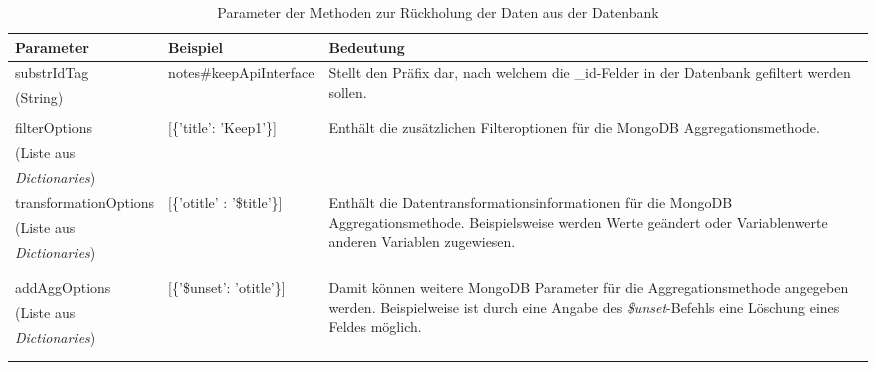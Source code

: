 \begin {table}[H]
\caption{Parameter der Methoden zur Rückholung der Daten aus der Datenbank}
\begin{tabular}{|p{3.6cm}|p{3.8cm}|p{6.4cm}|}
	\hline
	\textbf{Parameter} & \textbf{Beispiel} & \textbf{Bedeutung}\\
	\hline
	substrIdTag & notes\#keepApiInterface & \multirow{3}{6.4cm}{\begin{minipage}[p]{6.3cm}
			Stellt den Präfix dar, nach welchem die \_id-Felder in der Datenbank gefiltert werden sollen.
			\end{minipage}} \\
	 (String) & & \\
	 &&\\
	\hline
	filterOptions & [\{'title': 'Keep1'\}] & \multirow{3}{6.4cm}{\begin{minipage}[p]{6.3cm}
			Enthält die zusätzlichen Filteroptionen für die MongoDB Aggregationsmethode.
			\end{minipage}}\\
	(Liste aus &&\\
	\textit{Dictionaries})&&\\
	\hline
	transformationOptions & [\{'otitle' : '\$title'\}] & \multirow{5}{6.4cm}{\begin{minipage}[p]{6.3cm}
			Enthält die Datentransformationsinformationen für die MongoDB Aggregationsmethode. Beispielsweise werden Werte geändert oder Variablenwerte anderen Variablen zugewiesen.
			\end{minipage}}\\
	(Liste aus &&\\
	\textit{Dictionaries})&&\\
	&&\\
	&&\\
	\hline
	addAggOptions & [\{'\$unset': 'otitle'\}]& \multirow{5}{6.4cm}{\begin{minipage}[p]{6.3cm}
		Damit können weitere MongoDB Parameter für die Aggregationsmethode angegeben werden. Beispielweise ist durch eine Angabe des \textit{\$unset}-Befehls eine Löschung eines Feldes möglich.
		\end{minipage}}\\
	(Liste aus &&\\
	\textit{Dictionaries})&&\\
	&&\\
	&&\\
	\hline
\end{tabular}
\label{tab:params}
\end{table}

